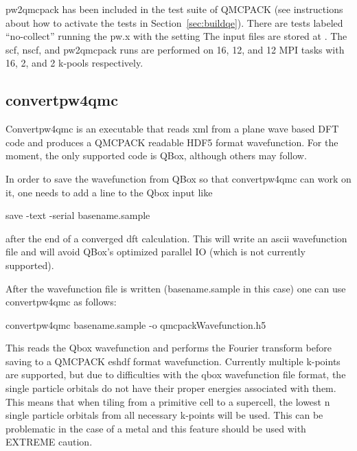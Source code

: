pw2qmcpack has been included in the test suite of QMCPACK (see instructions about how to activate the tests in Section~\ref{sec:buildqe}).
There are tests labeled ``no-collect'' running the pw.x with the setting 
The input files are stored at .
The scf, nscf, and pw2qmcpack runs are performed on 16, 12, and 12 MPI tasks with 16, 2, and 2 k-pools respectively.
\subsection{convertpw4qmc}
Convertpw4qmc is an executable that reads xml from a plane wave based DFT code and produces a QMCPACK readable 
HDF5 format wavefunction.  For the moment, the only supported code is QBox, although others may follow.

In order to save the wavefunction from QBox so that convertpw4qmc can work on it, one needs to add a line to the
Qbox input like
\begin{shade}
save -text -serial basename.sample
\end{shade}
after the end of a converged dft calculation.  This will write an ascii wavefunction file and will avoid
QBox's optimized parallel IO (which is not currently supported).

After the wavefunction file is written (basename.sample in this case) one can use convertpw4qmc as follows:
\begin{shade}
convertpw4qmc basename.sample -o qmcpackWavefunction.h5
\end{shade}

This reads the Qbox wavefunction and performs the Fourier transform before saving to a QMCPACK eshdf format wavefunction.  Currently multiple k-points are supported, but due to difficulties with the qbox wavefunction file format, the single particle orbitals do not have their proper energies associated with them.  This means that when tiling from a primitive cell to a supercell, the lowest n single particle orbitals from all necessary k-points will be used.  This can be problematic in the case of a metal and this feature should be used with EXTREME caution.


